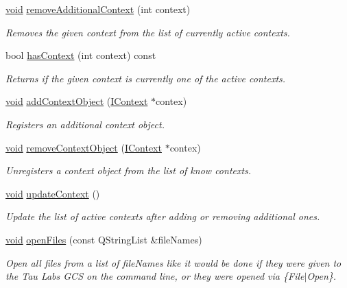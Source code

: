 \begin{DoxyCompactItemize}
\hyperlink{group___u_a_v_objects_plugin_ga444cf2ff3f0ecbe028adce838d373f5c}{void} \hyperlink{group___core_plugin_ga313953591f64d54fde23de1526ab1f75}{remove\-Additional\-Context} (int context)
\begin{DoxyCompactList}\small\item\em \-Removes the given {\itshape context\/} from the list of currently active contexts. \end{DoxyCompactList}\item 
bool \hyperlink{group___core_plugin_ga8769e5f914220ba8484cf286359e5b8d}{has\-Context} (int context) const 
\begin{DoxyCompactList}\small\item\em \-Returns if the given {\itshape context\/} is currently one of the active contexts. \end{DoxyCompactList}\item 
\hyperlink{group___u_a_v_objects_plugin_ga444cf2ff3f0ecbe028adce838d373f5c}{void} \hyperlink{group___core_plugin_gadb70e979c6c0d4d960b26251bbfc0baa}{add\-Context\-Object} (\hyperlink{class_core_1_1_i_context}{\-I\-Context} $\ast$contex)
\begin{DoxyCompactList}\small\item\em \-Registers an additional {\itshape context\/} object. \end{DoxyCompactList}\item 
\hyperlink{group___u_a_v_objects_plugin_ga444cf2ff3f0ecbe028adce838d373f5c}{void} \hyperlink{group___core_plugin_gacd2df84d0bcf6246537ea1a11bdb9193}{remove\-Context\-Object} (\hyperlink{class_core_1_1_i_context}{\-I\-Context} $\ast$contex)
\begin{DoxyCompactList}\small\item\em \-Unregisters a {\itshape context\/} object from the list of know contexts. \end{DoxyCompactList}\item 
\hyperlink{group___u_a_v_objects_plugin_ga444cf2ff3f0ecbe028adce838d373f5c}{void} \hyperlink{group___core_plugin_ga298e47b094767a344cb746f1a18b5ec2}{update\-Context} ()
\begin{DoxyCompactList}\small\item\em \-Update the list of active contexts after adding or removing additional ones. \end{DoxyCompactList}\item 
\hyperlink{group___u_a_v_objects_plugin_ga444cf2ff3f0ecbe028adce838d373f5c}{void} \hyperlink{group___core_plugin_ga09fd8daa4a7ca2cd3c3262df8c1c227c}{open\-Files} (const \-Q\-String\-List \&file\-Names)
\begin{DoxyCompactList}\small\item\em \-Open all files from a list of {\itshape file\-Names\/} like it would be done if they were given to the \-Tau \-Labs \-G\-C\-S on the command line, or they were opened via \{\-File$|$\-Open\}. \end{DoxyCompactList}\end{DoxyCompactItemize}
